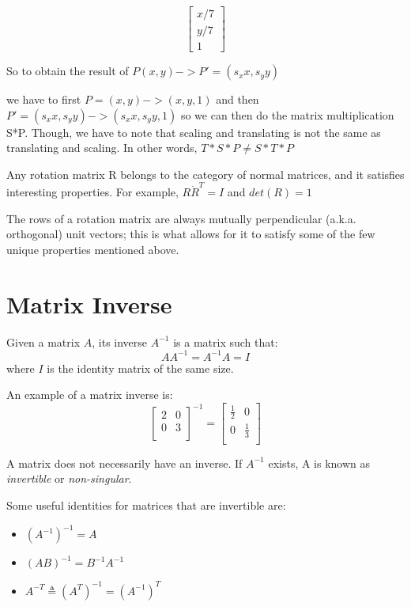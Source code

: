 \documentclass{article}
\begin{document}
\[
    \begin{bmatrix}
    x/7 \\
    y/7 \\
    1
  \end{bmatrix}
  \]

So to obtain the result of
$P(x,y) -> P' = (s_x x, s_y y)$

we have to first $P = (x, y) -> (x,y,1)$ and then $P' = (s_x x, s_y y) -> (s_x x, s_y y, 1)$ so we can then do the matrix multiplication S*P. Though, we have  to note that scaling and translating is not the same as translating and scaling. In other words, $T*S*P \neq S*T*P$

Any rotation matrix R belongs to the category of normal matrices, and it satisfies interesting properties. For example, $R \dot R^T = I$ and $det(R) = 1$

The rows of a rotation matrix are always mutually perpendicular (a.k.a. orthogonal) unit vectors; this is what allows for it to satisfy some of the few unique properties mentioned above.

\section{Matrix Inverse}
Given a matrix $A$, its inverse $A^{-1}$ is a matrix such that:
$$AA^{-1} = A^{-1}A = I$$
where $I$ is the identity matrix of the same size.

An example of a matrix inverse is:
$$
  \begin{bmatrix}
    2 & 0 \\
    0 & 3 \\
  \end{bmatrix}^{-1}
  =
  \begin{bmatrix}
    \frac{1}{2} & 0 \\
    0 & \frac{1}{3} \\
  \end{bmatrix}
$$

A matrix does not necessarily have an inverse. If $A^{-1}$ exists, A is known as \textit{invertible} or \textit{non-singular}.

Some useful identities for matrices that are invertible are:
\begin{itemize}
\item $(A^{-1})^{-1} = A$
\item $(AB)^{-1} = B^{-1}A^{-1}$
\item $A^{-T} \triangleq (A^T)^{-1} = (A^{-1})^T$
\end{itemize}
\end{document}
